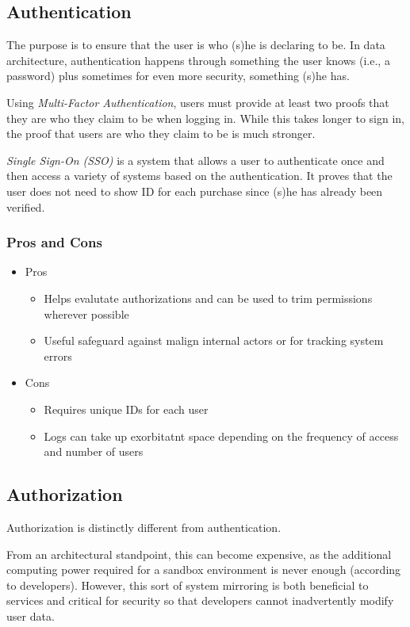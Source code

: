 \documentclass[12pt,a4paper]{article}
\begin{document}
\subsection{Authentication}

The purpose is to ensure that the user is who
(s)he is declaring to be. In data architecture,
authentication happens through something the
user knows (i.e., a password) plus sometimes for
even more security, something (s)he has.

Using \textit{Multi-Factor Authentication}, users must provide at least two proofs that they are who they claim to be when logging in. While this takes longer to sign in, the proof that users are who they claim to be is much stronger.

\textit{Single Sign-On (SSO)} is a system that allows a user to authenticate once and then access a variety of systems based on the authentication. It proves that the user does not need to show ID for each
purchase since (s)he has already been verified.

\subsubsection{Pros and Cons}

\begin{itemize}
	\item Pros
	\begin{itemize}
		\item Helps evalutate authorizations and can be used to trim permissions wherever possible
		\item Useful safeguard against malign internal actors or for tracking system errors
	\end{itemize}
	\item Cons 
		\begin{itemize}
			\item Requires unique IDs for each user
			\item Logs can take up exorbitatnt space depending on the frequency of access and number of users
		\end{itemize}
\end{itemize}

\subsection{Authorization}

Authorization is distinctly different from authentication. 

From an architectural standpoint, this can become
expensive, as the additional computing power
required for a sandbox environment is never
enough (according to developers). However,
this sort of system mirroring is both beneficial to
services and critical for security so that developers
cannot inadvertently modify user data.
\end{document}
